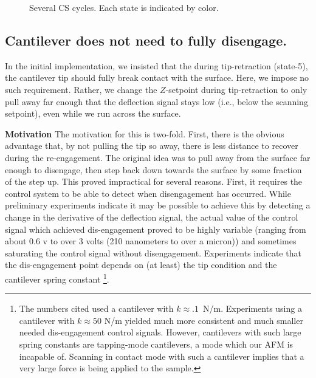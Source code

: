 \documentclass[twocolumn,twoside]{IEEEtran/IEEEtran}
\begin{document}
\begin{figure}[ht!]
  \centering 
  \caption{Several CS cycles. Each state is indicated by color.}
  \label{fig:mupathsignaltrajectory}
\end{figure}

%   

\subsection{Cantilever does not need to fully disengage.}
In the initial implementation, we insisted that the during tip-retraction
(state-5), the cantilever tip should fully break contact with the surface. Here,
we impose no such requirement. Rather, we change the $Z$-setpoint during
tip-retraction to only pull away far enough that the deflection signal stays low
(i.e., below the scanning setpoint), even while we run across the surface.

\textbf{Motivation} The motivation for this is two-fold. First, there is the
obvious advantage that, by not pulling the tip so away, there is less distance
to recover during the re-engagement. The original idea was to pull away from the
surface far enough to disengage, then step back down towards the surface by some
fraction of the step up. This proved impractical for several reasons. First, it
requires the control system to be able to detect when disengagement has
occurred. While preliminary experiments indicate it may be possible to achieve
this by detecting a change in the derivative of the deflection signal, the
actual value of the control signal which achieved dis-engagement proved to be
highly variable (ranging from about 0.6 v to over 3 volts (210 nanometers to
over a micron)) and sometimes saturating the control signal without
disengagement. Experiments indicate that the dis-engagement point depends on (at
least) the tip condition and the cantilever spring constant \footnote{The
  numbers cited used a cantilever with $k\approx .1$~N/m. Experiments using a
  cantilever with $k\approx 50$ N/m yielded much more consistent and much
  smaller needed dis-engagement control signals. However, cantilevers with such
  large spring constants are tapping-mode cantilevers, a mode which our AFM is
  incapable of. Scanning in contact mode with such a cantilever implies that a
  very large force is being applied to the sample.}.
\end{document}
